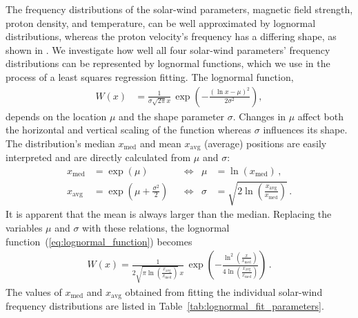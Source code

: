 \documentclass[]{aa}
\begin{document}
        The frequency distributions of the solar-wind parameters, magnetic field strength, proton density, and temperature, can be
        well approximated by lognormal distributions, whereas the proton velocity’s frequency has a differing shape, as shown in \citet{Veselovsky2010}. We investigate how well all four solar-wind parameters’ frequency distributions can be represented by lognormal functions, which we use in the process of a least squares regression fitting. The lognormal function, 
        \begin{align}
                W(x) &= \frac{1}{\sigma \sqrt{2 \pi} x} \, \exp\left(- \frac{\left(\ln x - \mu\right)^2}{2 \sigma^2}\right),    \label{eq:lognormal_function}
        \end{align}
        depends on the location $\mu$ and the shape parameter $\sigma$. Changes in $\mu$ affect both the horizontal and vertical scaling of the function whereas $\sigma$ influences its shape. The distribution's median $x_\text{med}$ and mean $x_\text{avg}$ (average) positions are easily interpreted and are directly calculated from $\mu$ and $\sigma$:
        \begin{align}
                x_\text{med} &= \exp\left(\mu\right)    &       &\Longleftrightarrow    &       \mu &= \ln\left(x_\text{med}\right)\,,      \label{eq:lognormal_median}\\
                x_\text{avg} &= \exp\left(\mu + \frac{\sigma^2}{2}\right)       &       &\Longleftrightarrow    &       \sigma &= \sqrt{2 \ln\left(\frac{x_\text{avg}}{x_\text{med}}\right)}\,.        \label{eq:lognormal_mean}
        \end{align}
        It is apparent that the mean is always larger than the median. Replacing the variables $\mu$ and $\sigma$ with these relations, the lognormal function~(\ref{eq:lognormal_function}) becomes
        \begin{align}
                W(x) = \frac{1}{2 \sqrt{\pi \ln\left(\frac{x_\text{avg}}{x_\text{med}}\right)} \, x} \, \exp\left(- \frac{\ln^2\left(\frac{x}{x_\text{med}}\right)}{4 \ln\left(\frac{x_\text{avg}}{x_\text{med}}\right)}\right)\,.     \label{eq:single_lognormal_fit_function}
        \end{align}
        The values of $x_\text{med}$ and $x_\text{avg}$ obtained from fitting the individual solar-wind frequency distributions are listed in Table~\ref{tab:lognormal_fit_parameters}.
\end{document}
